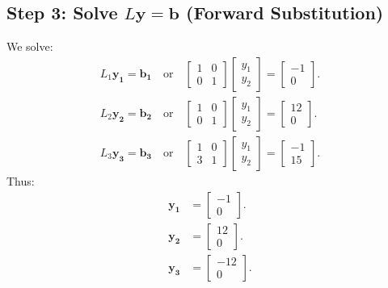 \documentclass[journal]{IEEEtran}
\numberwithin{equation}{enumi}
\numberwithin{figure}{enumi}
\begin{document}
\begin{enumerate}
	\subsection*{Step 3: Solve $L\mathbf{y} = \mathbf{b}$ (Forward Substitution)}
	We solve:
	\begin{align}
		L_1\mathbf{y_1} = \mathbf{b_1} \quad \text{or} \quad \begin{bmatrix} 1 & 0 \\ 0 & 1 \end{bmatrix} \begin{bmatrix} y_1 \\ y_2 \end{bmatrix} = \begin{bmatrix} -1 \\ 0 \end{bmatrix}.\\
        L_2\mathbf{y_2} = \mathbf{b_2} \quad \text{or} \quad \begin{bmatrix} 1 & 0 \\ 0 & 1 \end{bmatrix} \begin{bmatrix} y_1 \\ y_2 \end{bmatrix} = \begin{bmatrix} 12 \\ 0 \end{bmatrix}.\\
        L_3\mathbf{y_3} = \mathbf{b_3} \quad \text{or} \quad \begin{bmatrix} 1 & 0 \\ 3 & 1 \end{bmatrix} \begin{bmatrix} y_1 \\ y_2 \end{bmatrix} = \begin{bmatrix} -1 \\ 15 \end{bmatrix}.
	\end{align}
	Thus:
	\begin{align}
		\mathbf{y_1} &= \begin{bmatrix} -1 \\ 0 \end{bmatrix}.\\
        \mathbf{y_2} &= \begin{bmatrix} 12 \\ 0 \end{bmatrix}.\\
        \mathbf{y_3} &= \begin{bmatrix} -12 \\ 0 \end{bmatrix}.\\
	\end{align}
    	

\end{enumerate}
\end{document}
